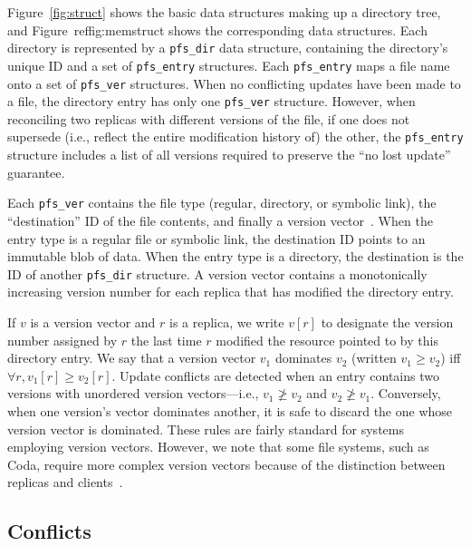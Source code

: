 

Figure~\ref{fig:struct} shows the basic data structures making up a
directory tree, and Figure~ref{fig:memstruct} shows the corresponding
data structures.  Each directory is represented by a \texttt{pfs\_dir}
data structure, containing the directory's unique ID and a set of
\texttt{pfs\_entry} structures.  Each \texttt{pfs\_entry} maps a file
name onto a set of \texttt{pfs\_ver} structures.  When no conflicting
updates have been made to a file, the directory entry has only one
\texttt{pfs\_ver} structure.  However, when reconciling two replicas
with different versions of the file, if one does not supersede (i.e.,
reflect the entire modification history of) the other, the
\texttt{pfs\_entry} structure includes a list of all versions required
to preserve the ``no lost update'' guarantee.

Each \texttt{pfs\_ver} contains the file type (regular, directory, or
symbolic link), the ``destination'' ID of the file contents, and
finally a version vector~\cite{parker:inconsistency}.  When the entry
type is a regular file or symbolic link, the destination ID points to
an immutable blob of data.  When the entry type is a directory, the
destination is the ID of another \texttt{pfs\_dir} structure.  A
version vector contains a monotonically increasing version number for
each replica that has modified the directory entry.

If $v$ is a version vector and $r$ is a replica, we write $v[r]$ to
designate the version number assigned by $r$ the last time $r$
modified the resource pointed to by this directory entry.  We say that
a version vector $v_1$ dominates $v_2$ (written $v_1\ge v_2$) iff
$\forall r, v_1[r]\ge v_2[r]$.  Update conflicts are detected when an
entry contains two versions with unordered version vectors---i.e.,
$v_1\not\ge v_2$ and $v_2\not\ge v_1$.  Conversely, when one version's
vector dominates another, it is safe to discard the one whose version
vector is dominated.  These rules are fairly standard for systems
employing version vectors.  However, we note that some file systems,
such as Coda, require more complex version vectors because of the
distinction between replicas and clients~\cite{satyanarayanan:coda}.

\subsection{Conflicts}

